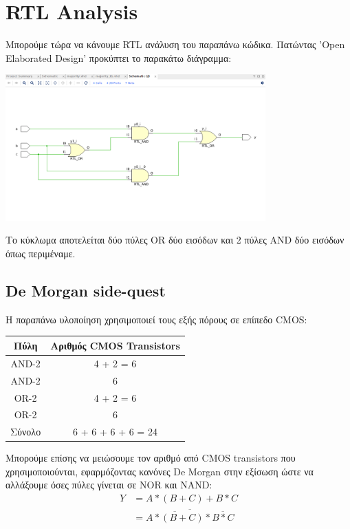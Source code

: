 \documentclass[]{article}
\begin{document}
\section{RTL Analysis}
Μπορούμε τώρα να κάνουμε RTL ανάλυση του παραπάνω κώδικα. Πατώντας 'Open Elaborated Design'
προκύπτει το παρακάτω διάγραμμα:
\begin{center}
	\includegraphics[width=10cm]{rtl_schem.png}
\end{center}

Το κύκλωμα αποτελείται δύο πύλες OR δύο εισόδων και 2 πύλες AND δύο εισόδων όπως περιμέναμε.

\subsection{De Morgan side-quest}
Η παραπάνω υλοποίηση χρησιμοποιεί τους εξής πόρους σε επίπεδο CMOS:
\begin{center}
	\begin{tabular}{| c | c |}
		\hline Πύλη   & Αριθμός CMOS Transistors \\
		\hline AND-2  & 4 + 2 = 6                \\
		AND-2         & 6                        \\
		OR-2          & 4 + 2 = 6                \\
		OR-2          & 6                        \\
		\hline Σύνολο & 6 + 6 + 6 + 6 = 24       \\
		\hline
	\end{tabular}
\end{center}

Μπορούμε επίσης να μειώσουμε τον αριθμό από CMOS transistors που χρησιμοποιούνται, εφαρμόζοντας κανόνες De Morgan στην εξίσωση ώστε να αλλάξουμε όσες πύλες γίνεται σε NOR και NAND:
\begin{align*}
	Y & = A * (B + C) + B * C                                  \\
	  & = \overline{\overline{A * (B + C)} * \overline{B * C}} \\
\end{align*}
\end{document}
